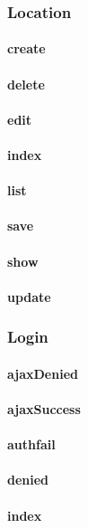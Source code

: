 \documentclass[12pt]{article}
\begin{document}
\subsubsection{Location}\label{sec:CLocation}
\paragraph{create}
\paragraph{delete}
\paragraph{edit}
\paragraph{index}
\paragraph{list}
\paragraph{save}
\paragraph{show}
\paragraph{update}

\subsubsection{Login}\label{sec:CLogin}
\paragraph{ajaxDenied}
\paragraph{ajaxSuccess}
\paragraph{authfail}
\paragraph{denied}
\paragraph{index}
\end{document}
